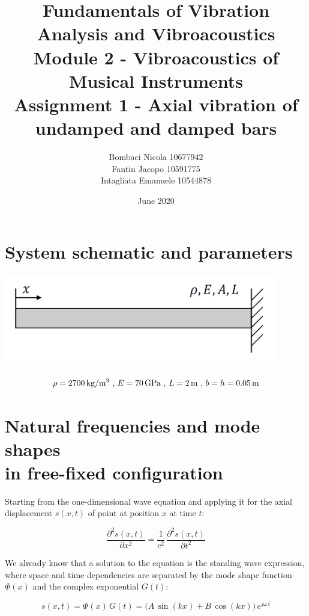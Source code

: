 \documentclass[a4paper,12pt,oneside]{article}
\title{Fundamentals of Vibration Analysis and Vibroacoustics \\
	Module 2 - Vibroacoustics of Musical Instruments \\
	Assignment 1 - Axial vibration of undamped and damped bars}
\author{Bombaci Nicola 10677942 \\
	Fantin Jacopo 10591775 \\
	Intagliata Emanuele 10544878}
\date{June 2020}
\begin{document}
\maketitle

\vspace{100pt}

\section*{System schematic and parameters}

\includegraphics[width=0.9\textwidth]{system_schematic}

\vspace{30pt}

\[
	\rho = 2700 \, \text{kg/m\textsuperscript{3}} ~ \text{,} ~ E = 70 \, \text{GPa}
		~ \text{,} ~ L = 2 \, \text{m} ~ \text{,} ~ b = h = 0.05 \, \text{m}
\]

\clearpage


\section{Natural frequencies and mode shapes \\ in free-fixed configuration}
\label{sec:nat_freqs_and_mode_shapes_free_fixed}

Starting from the one-dimensional wave equation and applying it for the axial displacement $ s(x,t) $ of point at position $ x $ at time $ t $:

\[
	\frac{\partial^2 s(x,t)}{\partial x^2} =
		\frac{1}{c^2} \, \frac{\partial^2 s(x,t)}{\partial t^2}
\]

We already know that a solution to the equation is the standing wave expression, where space and time dependencies are separated by the mode shape function $ \Phi(x) $ and the complex exponential $ G(t) $:

\[
	s(x,t) = \Phi(x) \, G(t) =
		\bigl(A \, \sin(kx) + B \, \cos(kx)\bigl) \, e^{j \omega \, t}
\]

\vspace{10pt}
\end{document}

